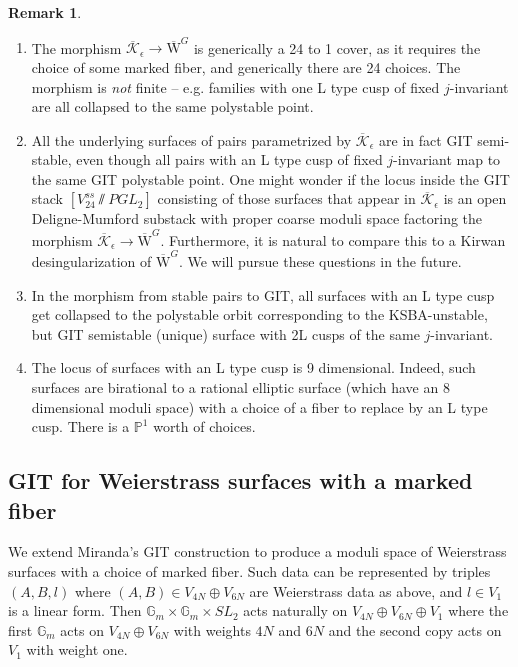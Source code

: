 \documentclass[11pt]{amsart}
\theoremstyle{definition}
\newtheorem{remark}[theorem]{Remark}
\theoremstyle{remark}
\newcommand{\mb}[1]{\mathbb{#1}}
\newcommand{\oMG}{\overline{\mathrm{W}}^G}
\newcommand{\ke}{\overline{\mathcal{K}}_{\epsilon}}
\begin{document}
	\begin{remark}\leavevmode
		\begin{enumerate}
			\item The morphism $\ke \to \oMG$ is generically a 24 to 1 cover, as it requires the choice of some marked fiber, and generically there are 24 choices. The morphism is \emph{not} finite -- e.g. families with one L type cusp of fixed $j$-invariant are all collapsed to the same polystable point. 
			
			\item All the underlying surfaces of pairs parametrized by $\ke$ are in fact GIT semi-stable, even though all pairs with an L type cusp of fixed $j$-invariant map to the same GIT polystable point. One might wonder if the locus inside the GIT stack $[V_{24}^{ss} \sslash PGL_2]$ consisting of those surfaces that appear in $\ke$ is an open Deligne-Mumford substack with proper coarse moduli space factoring the morphism $\ke \to \oMG$. Furthermore, it is natural to compare this to a Kirwan desingularization of $\oMG$. We will pursue these questions in the future. 
			
			\item In the morphism from stable pairs to GIT, all surfaces with an L type cusp get collapsed to the polystable orbit corresponding to the KSBA-unstable, but GIT semistable (unique) surface with 2L cusps of the same $j$-invariant.
			\item The locus of surfaces with an L type cusp is 9 dimensional. Indeed, such surfaces are birational to a rational elliptic surface (which have an 8 dimensional moduli space) with a choice of a fiber to replace by an L type cusp. There is a $\mb{P}^1$ worth of choices. 
		\end{enumerate}
	\end{remark}
	
	
	
	
	
	
	
	
	\subsection{GIT for Weierstrass surfaces with a marked fiber}\label{sec:git2}
	
	We extend Miranda's GIT construction to produce a moduli space of Weierstrass surfaces with a choice of marked fiber. Such data can be represented by triples $(A,B,l)$ where $(A,B) \in V_{4N} \oplus V_{6N}$ are Weierstrass data as above, and $l \in V_1$ is a linear form. Then $\mb{G}_m \times \mb{G}_m \times SL_2$ acts naturally on $V_{4N} \oplus V_{6N} \oplus V_1$ where the first $\mb{G}_m$ acts on $V_{4N} \oplus V_{6N}$ with weights $4N$ and $6N$ and the second copy acts on $V_1$ with weight one. 
	
\end{document}
